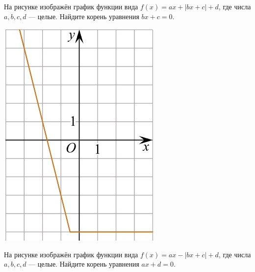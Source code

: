 \begin{class}[number=6]
\begin{listofex}
\begin{minipage}[c]{0.1\textwidth}
			\end{minipage}
			\item
			\begin{minipage}[t]{0.43\textwidth}
				На рисунке изображён график функции вида \(f(x)=ax+|bx+c|+d\), где числа \(a, b, c, d\) --- целые. Найдите корень уравнения \(bx+c=0\).
			\end{minipage}
			\begin{minipage}[c]{0.1\textwidth}
				\includegraphics[align=t, width=\textwidth]{../../pics/G111M4C5-5.jpg}
			\end{minipage}
			\item
			\begin{minipage}[t]{0.43\textwidth}
				На рисунке изображён график функции вида \(f(x)=ax-|bx+c|+d\), где числа \(a, b, c, d\) --- целые. Найдите корень уравнения \(ax+d=0\).
			\end{minipage}

\end{listofex}
\end{class}

